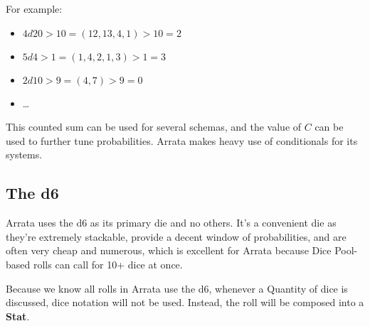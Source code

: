 \documentclass[../main.tex]{subfiles}
\begin{document}
    For example:

    \begin{itemize}
        \item $4d20>10 = (12, 13, 4, 1)>10 = 2$
        \item $5d4>1 = (1, 4, 2, 1, 3)>1 = 3$
        \item $2d10>9 = (4, 7)>9 = 0$
        \item \dots
    \end{itemize}

    This counted sum can be used for several schemas, and the value of $C$ can be used to further tune probabilities. Arrata makes heavy use of conditionals for its systems.

    \subsection{The d6}

    Arrata uses the d6 as its primary die and no others. It's a convenient die as they're extremely stackable, provide a decent window of probabilities, and are often very cheap and numerous, which is excellent for Arrata because Dice Pool-based rolls can call for 10+ dice at once.

    Because we know all rolls in Arrata use the d6, whenever a Quantity of dice is discussed, dice notation will not be used. Instead, the roll will be composed into a \textbf{Stat}.
\end{document}

